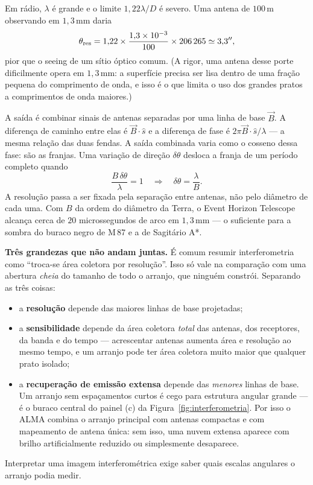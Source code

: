\documentclass[11pt,a4paper]{article}
\begin{document}
Em rádio, $\lambda$ é grande e o limite $1{,}22\lambda/D$ é severo. Uma antena de $100\,\mathrm{m}$ observando em
$1{,}3\,\mathrm{mm}$ daria
\[
\theta_{\rm res}=1{,}22\times\frac{1{,}3\times10^{-3}}{100}\times206\,265\simeq3{,}3'',
\]
pior que o seeing de um sítio óptico comum. (A rigor, uma antena desse porte dificilmente opera em
$1{,}3\,\mathrm{mm}$: a superfície precisa ser lisa dentro de uma fração pequena do comprimento de onda, e isso
é o que limita o uso dos grandes pratos a comprimentos de onda maiores.)

A saída é combinar sinais de antenas separadas por uma linha de base $\vec{B}$. A diferença de caminho entre elas
é $\vec{B}\cdot\hat{s}$ e a diferença de fase é $2\pi\vec{B}\cdot\hat{s}/\lambda$ --- a mesma relação das duas
fendas. A saída combinada varia como o cosseno dessa fase: são as franjas. Uma variação de direção $\delta\theta$
desloca a franja de um período completo quando
\[
\frac{B\,\delta\theta}{\lambda}=1
\quad\Longrightarrow\quad
\delta\theta=\frac{\lambda}{B}.
\]
A resolução passa a ser fixada pela separação entre antenas, não pelo diâmetro de cada uma. Com $B$ da ordem do
diâmetro da Terra, o Event Horizon Telescope alcança cerca de $20$ microssegundos de arco em $1{,}3\,\mathrm{mm}$
--- o suficiente para a sombra do buraco negro de M\,87 e a de Sagitário A*.

\begin{noticebox}
\textbf{Três grandezas que não andam juntas.} É comum resumir interferometria como ``troca-se área coletora por
resolução''. Isso só vale na comparação com uma abertura \emph{cheia} do tamanho de todo o arranjo, que ninguém
constrói. Separando as três coisas:
\begin{itemize}
\item a \textbf{resolução} depende das maiores linhas de base projetadas;
\item a \textbf{sensibilidade} depende da área coletora \emph{total} das antenas, dos receptores, da banda e do
tempo --- acrescentar antenas aumenta área e resolução ao mesmo tempo, e um arranjo pode ter área coletora muito
maior que qualquer prato isolado;
\item a \textbf{recuperação de emissão extensa} depende das \emph{menores} linhas de base. Um arranjo sem
espaçamentos curtos é cego para estrutura angular grande --- é o buraco central do painel (c) da
Figura~\ref{fig:interferometria}. Por isso o ALMA combina o arranjo principal com antenas compactas e com
mapeamento de antena única: sem isso, uma nuvem extensa aparece com brilho artificialmente reduzido ou
simplesmente desaparece.
\end{itemize}
Interpretar uma imagem interferométrica exige saber quais escalas angulares o arranjo podia medir.
\end{noticebox}
\end{document}

